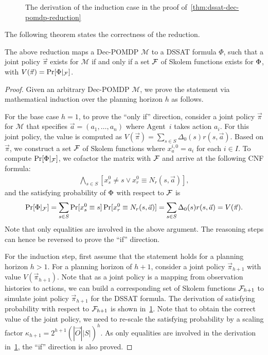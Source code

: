 \begin{figure}[t]
    \centering
    
    \caption{The derivation of the induction case in the proof of~\cref{thm:dssat-dec-pomdp-reduction}}
    \label{fig:dssat-dec-pomdp-derivation}
\end{figure}

The following theorem states the correctness of the reduction.
\begin{theorem}\label{thm:dssat-dec-pomdp-reduction}
    The above reduction maps a Dec-POMDP $\mathcal{M}$ to a DSSAT formula $\Phi$,
    such that a joint policy $\vec{\pi}$ exists for $\mathcal{M}$ if and only if
    a set $\mathcal{F}$ of Skolem functions exists for $\Phi$, with $V(\vec{\pi})=\Pr[\Phi|_{\mathcal{F}}]$.
\end{theorem}
\begin{proof}
    Given an arbitrary Dec-POMDP $\mathcal{M}$,
    we prove the statement via mathematical induction over the planning horizon $h$ as follows.

    For the base case $h=1$,
    to prove the ``only if'' direction,
    consider a joint policy $\vec{\pi}$ for $\mathcal{M}$ that specifies $\vec{a}=(a_1,\ldots,a_n)$
    where Agent~$i$ takes action $a_i$.
    For this joint policy,
    the value is computed as $V(\vec{\pi})=\sum_{s \in S}\Delta_0(s)r(s,\vec{a})$.
    Based on $\vec{\pi}$,
    we construct a set $\mathcal{F}$ of Skolem functions where $x_a^{i,0}=a_i$ for each $i\in I$.
    To compute $\Pr[\Phi|_{\mathcal{F}}]$,
    we cofactor the matrix with $\mathcal{F}$ and arrive at the following CNF formula:
    \begin{align*}
        \bigwedge_{s\in S}[x_s^0\neq s \vee x_r^0 \equiv N_r(s,\vec{a})],
    \end{align*}
    and the satisfying probability of $\Phi$ with respect to $\mathcal{F}$ is
    \begin{align*}
        \Pr[\Phi|_{\mathcal{F}}]=
        \sum_{s\in S}\Pr[x_s^0 \equiv s]\Pr[x_r^0 \equiv N_r(s,\vec{a})]=
        \sum_{s\in S}\Delta_0(s)r(s,\vec{a})=V(\vec{\pi}).
    \end{align*}
    Note that only equalities are involved in the above argument.
    The reasoning steps can hence be reversed to prove the ``if'' direction.

    For the induction step,
    first assume that the statement holds for a planning horizon $h>1$.
    For a planning horizon of $h+1$,
    consider a joint policy $\vec{\pi}_{h+1}$ with value $V(\vec{\pi}_{h+1})$.
    Note that as a joint policy is a mapping from observation histories to actions,
    we can build a corresponding set of Skolem functions $\mathcal{F}_{h+1}$ to simulate joint policy $\vec{\pi}_{h+1}$ for the DSSAT formula.
    The derivation of satisfying probability with respect to $\mathcal{F}_{h+1}$ is shown in~\cref{fig:dssat-dec-pomdp-derivation}.
    Note that to obtain the correct value of the joint policy,
    we need to re-scale the satisfying probability by a scaling factor $\kappa_{h+1}=2^{h+1}(|\vec{O}||S|)^{h}$.
    As only equalities are involved in the derivation in~\cref{fig:dssat-dec-pomdp-derivation},
    the ``if'' direction is also proved.


\end{proof}
